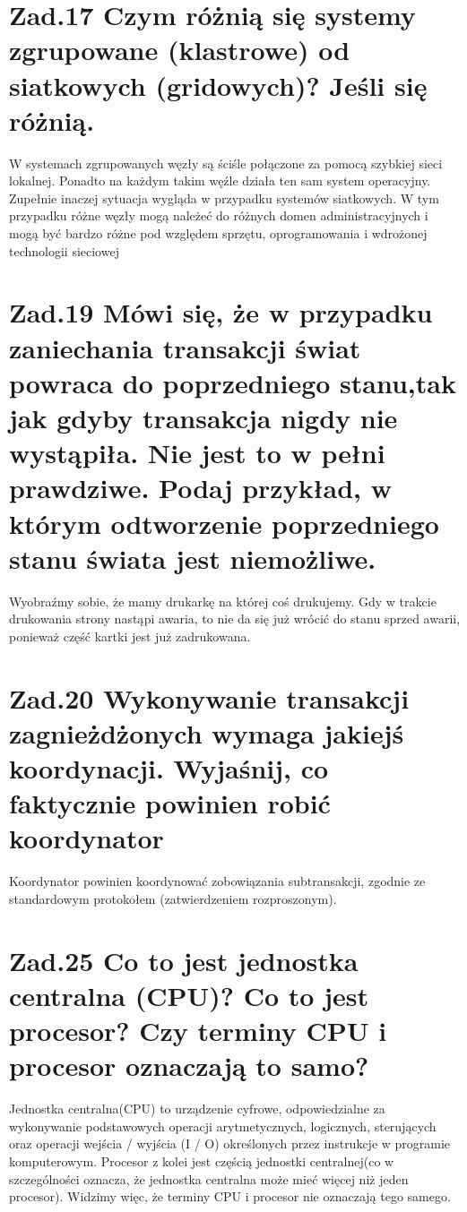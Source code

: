 \documentclass[10pt, a4paper]{article}
\begin{document}
\section*{Zad.17 Czym różnią się systemy zgrupowane (klastrowe) od siatkowych (gridowych)? Jeśli się różnią.}
W systemach zgrupowanych węzły są ściśle połączone za pomocą szybkiej sieci lokalnej. Ponadto na każdym takim węźle działa ten sam system operacyjny. Zupełnie inaczej sytuacja wygląda w przypadku systemów siatkowych. W tym przypadku różne węzły mogą należeć do różnych domen administracyjnych i mogą być bardzo różne pod względem sprzętu, oprogramowania i wdrożonej technologii sieciowej
\section*{Zad.19 Mówi się, że w przypadku zaniechania transakcji świat powraca do poprzedniego stanu,tak jak gdyby transakcja nigdy nie wystąpiła. Nie jest to w pełni prawdziwe. Podaj przykład, w którym odtworzenie poprzedniego stanu świata jest niemożliwe.}
Wyobraźmy sobie, że mamy drukarkę na której coś drukujemy. Gdy w trakcie drukowania strony nastąpi awaria, to nie da się już wrócić do stanu sprzed awarii, ponieważ część kartki jest już zadrukowana.
\section*{Zad.20 Wykonywanie transakcji zagnieżdżonych wymaga jakiejś koordynacji. Wyjaśnij, co faktycznie powinien robić koordynator}
Koordynator powinien koordynować zobowiązania subtransakcji, zgodnie ze standardowym protokołem (zatwierdzeniem rozproszonym).
\section*{Zad.25 Co to jest jednostka centralna (CPU)? Co to jest procesor? Czy terminy CPU i procesor oznaczają to samo?}
Jednostka centralna(CPU) to urządzenie cyfrowe, odpowiedzialne za wykonywanie podstawowych operacji arytmetycznych, logicznych, sterujących oraz operacji wejścia / wyjścia (I / O) określonych przez instrukcje w programie komputerowym. Procesor z kolei jest częścią jednostki centralnej(co w szczególności oznacza, że jednostka centralna może mieć więcej niż jeden procesor).  Widzimy więc, że terminy CPU i procesor nie oznaczają tego samego.
\end{document}
